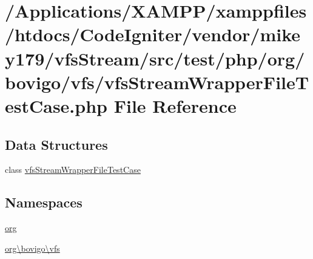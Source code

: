 \hypertarget{vfs_stream_wrapper_file_test_case_8php}{}\section{/\+Applications/\+X\+A\+M\+P\+P/xamppfiles/htdocs/\+Code\+Igniter/vendor/mikey179/vfs\+Stream/src/test/php/org/bovigo/vfs/vfs\+Stream\+Wrapper\+File\+Test\+Case.php File Reference}
\label{vfs_stream_wrapper_file_test_case_8php}
\subsection*{Data Structures}
\begin{DoxyCompactItemize}
\item 
class \mbox{\hyperlink{classorg_1_1bovigo_1_1vfs_1_1vfs_stream_wrapper_file_test_case}{vfs\+Stream\+Wrapper\+File\+Test\+Case}}
\end{DoxyCompactItemize}
\subsection*{Namespaces}
\begin{DoxyCompactItemize}
\item 
 \mbox{\hyperlink{namespaceorg}{org}}
\item 
 \mbox{\hyperlink{namespaceorg_1_1bovigo_1_1vfs}{org\textbackslash{}bovigo\textbackslash{}vfs}}
\end{DoxyCompactItemize}
